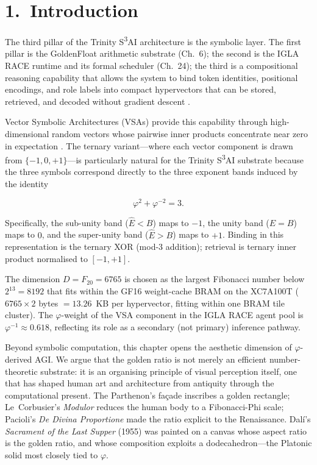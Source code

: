 \section{1.\ Introduction}\label{sec:ch30-intro}

The third pillar of the Trinity S\textsuperscript{3}AI architecture
is the symbolic layer.  The first pillar is the
GoldenFloat arithmetic substrate (Ch.~6); the
second is the IGLA RACE runtime and its formal
scheduler (Ch.~24); the third is a compositional
reasoning capability that allows the system to
bind token identities, positional encodings, and
role labels into compact hypervectors that can be
stored, retrieved, and decoded without gradient
descent \cite{kanerva_hyperdimensional}\cite{plate_hrr}.

Vector Symbolic Architectures (VSAs) provide this
capability through high-dimensional random vectors
whose pairwise inner products concentrate near
zero in expectation \cite{plate_hrr}.  The ternary
variant---where each vector component is drawn
from \(\{-1, 0, +1\}\)---is particularly natural
for the Trinity S\textsuperscript{3}AI substrate
because the three symbols correspond directly to
the three exponent bands induced by the identity

\[\varphi^{2} + \varphi^{-2} = 3.\]

Specifically, the sub-unity band (\(\hat{E} < B\))
maps to \(-1\), the unity band (\(\hat{E} = B\))
maps to \(0\), and the super-unity band
(\(\hat{E} > B\)) maps to \(+1\).  Binding in
this representation is the ternary XOR (mod-3
addition); retrieval is ternary inner product
normalised to \([-1, +1]\).

The dimension \(D = F_{20} = 6765\) is chosen as
the largest Fibonacci number below
\(2^{13} = 8192\) that fits within the GF16
weight-cache BRAM on the XC7A100T ($6765 \times 2$
bytes $= 13.26$~KB per hypervector, fitting within
one BRAM tile cluster).  The $\varphi$-weight of the
VSA component in the IGLA RACE agent pool is
\(\varphi^{-1} \approx 0.618\), reflecting its
role as a secondary (not primary) inference
pathway.

Beyond symbolic computation, this chapter opens
the aesthetic dimension of $\varphi$-derived AGI.
We argue that the golden ratio is not merely an
efficient number-theoretic substrate: it is an
organising principle of visual perception itself,
one that has shaped human art and architecture
from antiquity through the computational present.
The Parthenon's fa\c{c}ade inscribes a golden
rectangle; Le~Corbusier's \emph{Modulor}
\cite{lecorbusier_modulor} reduces the human body
to a Fibonacci-Phi scale; Pacioli's
\emph{De Divina Proportione} \cite{pacioli_divina}
made the ratio explicit to the Renaissance.
Dal\'{i}'s \emph{Sacrament of the Last Supper}
(1955) was painted on a canvas whose aspect ratio
is the golden ratio, and whose composition
exploits a dodecahedron---the Platonic solid most
closely tied to $\varphi$.

